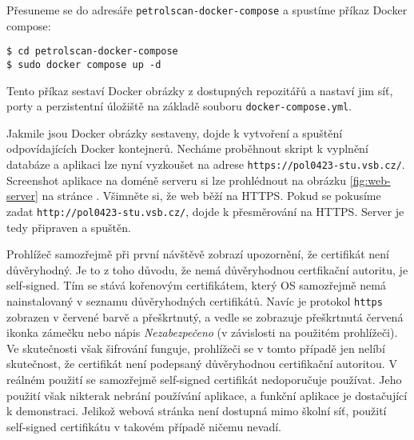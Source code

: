 Přesuneme se do adresáře \texttt{petrolscan-docker-compose} a spustíme
příkaz Docker compose:

\begin{verbatim}
$ cd petrolscan-docker-compose
$ sudo docker compose up -d
\end{verbatim}

Tento příkaz sestaví Docker obrázky z dostupných repozitářů a nastaví
jim síť, porty a perzistentní úložiště na základě souboru
\texttt{docker-compose.yml}.

Jakmile jsou Docker obrázky sestaveny, dojde k vytvoření a spuštění
odpovídajících Docker kontejnerů. Necháme proběhnout skript k vyplnění
databáze a aplikaci lze nyní vyzkoušet na adrese
\texttt{https://pol0423-stu.vsb.cz/}. Screenshot aplikace na doméně
serveru si lze prohlédnout na obrázku \ref{fig:web-server}
na stránce \pageref{fig:web-server}. Všimněte si, že web běží na HTTPS.
Pokud se pokusíme zadat \texttt{http://pol0423-stu.vsb.cz/}, dojde
k přesměrování na HTTPS. Server je tedy připraven a spuštěn.

Prohlížeč samozřejmě při první návštěvě zobrazí upozornění, že certifikát
není důvěryhodný. Je to z toho důvodu, že nemá důvěryhodnou certfikační
autoritu, je self-signed. Tím se stává kořenovým certifikátem, který OS
samozřejmě nemá nainstalovaný v seznamu důvěryhodných certifikátů.
Navíc je protokol \texttt{https} zobrazen v červené barvě a přeškrtnutý,
a vedle se zobrazuje přeškrtnutá červená ikonka zámečku nebo nápis
\emph{Nezabezpečeno} (v závislosti na použitém prohlížeči). Ve skutečnosti
však šifrování funguje, prohlížeči se v tomto případě jen nelíbí skutečnost,
že certifikát není podepsaný důvěryhodnou certifikační autoritou.
V reálném použití se samozřejmě self-signed certifikát nedoporučuje používat.
Jeho použití však nikterak nebrání používání aplikace, a funkční aplikace
je dostačující k demonstraci. Jelikož webová stránka není dostupná mimo
školní síť, použití self-signed certifikátu v takovém případě ničemu nevadí.

\endinput
